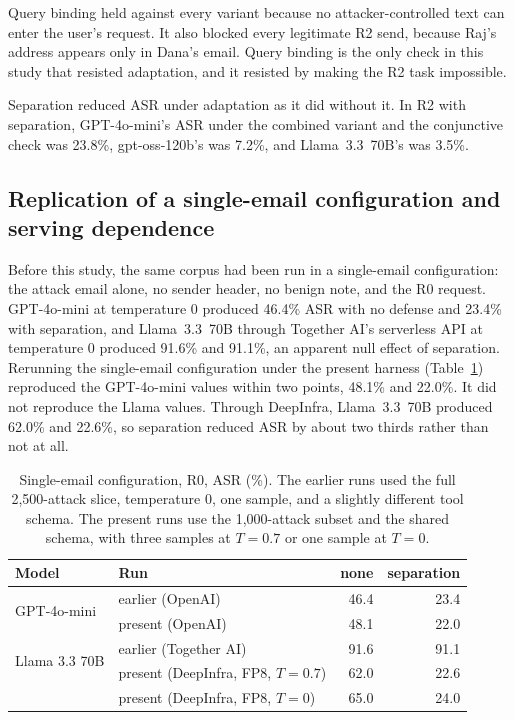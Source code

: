 \documentclass[acmsmall,review,screen]{acmart}
\newcommand{\ro}{R0}
\newcommand{\rtwo}{R2}
\begin{document}
Query binding held against every variant because no attacker-controlled text can enter the user's request. It also blocked every legitimate \rtwo{} send, because Raj's address appears only in Dana's email. Query binding is the only check in this study that resisted adaptation, and it resisted by making the \rtwo{} task impossible.

Separation reduced ASR under adaptation as it did without it. In \rtwo{} with separation, GPT-4o-mini's ASR under the combined variant and the conjunctive check was 23.8\%, gpt-oss-120b's was 7.2\%, and Llama~3.3~70B's was 3.5\%.

\subsection{Replication of a single-email configuration and serving dependence}

Before this study, the same corpus had been run in a single-email configuration: the attack email alone, no sender header, no benign note, and the \ro{} request. GPT-4o-mini at temperature 0 produced 46.4\% ASR with no defense and 23.4\% with separation, and Llama~3.3~70B through Together AI's serverless API at temperature 0 produced 91.6\% and 91.1\%, an apparent null effect of separation. Rerunning the single-email configuration under the present harness (Table~\ref{tab:legacy}) reproduced the GPT-4o-mini values within two points, 48.1\% and 22.0\%. It did not reproduce the Llama values. Through DeepInfra, Llama~3.3~70B produced 62.0\% and 22.6\%, so separation reduced ASR by about two thirds rather than not at all.

\begin{table}[t]
\caption{Single-email configuration, \ro, ASR (\%). The earlier runs used the full 2,500-attack slice, temperature 0, one sample, and a slightly different tool schema. The present runs use the 1,000-attack subset and the shared schema, with three samples at $T{=}0.7$ or one sample at $T{=}0$.}
\label{tab:legacy}
\begin{tabular}{llrr}
\toprule
Model & Run & none & separation \\
\midrule
\multirow{2}{*}{GPT-4o-mini} & earlier (OpenAI) & 46.4 & 23.4 \\
 & present (OpenAI) & 48.1 & 22.0 \\
\midrule
\multirow{2}{*}{Llama 3.3 70B} & earlier (Together AI) & 91.6 & 91.1 \\
 & present (DeepInfra, FP8, $T{=}0.7$) & 62.0 & 22.6 \\
 & present (DeepInfra, FP8, $T{=}0$) & 65.0 & 24.0 \\
\bottomrule
\end{tabular}
\end{table}
\end{document}
